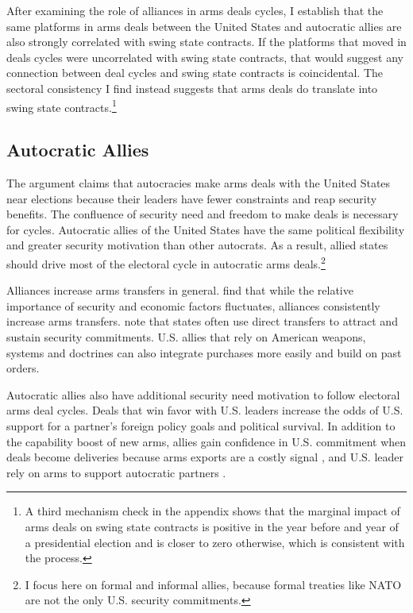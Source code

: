 \documentclass[12pt]{article}
\begin{document}
After examining the role of alliances in arms deals cycles, I establish that the same platforms in arms deals between the United States and autocratic allies are also strongly correlated with swing state contracts.
If the platforms that moved in deals cycles were uncorrelated with swing state contracts, that would suggest any connection between deal cycles and swing state contracts is coincidental.
The sectoral consistency I find instead suggests that arms deals do translate into swing state contracts.\footnote{A third mechanism check in the appendix shows that the marginal impact of arms deals on swing state contracts is positive in the year before and year of a presidential election and is closer to zero otherwise, which is consistent with the process.}



\subsection{Autocratic Allies}


The argument claims that autocracies make arms deals with the United States near elections because their leaders have fewer constraints and reap security benefits. 
The confluence of security need and freedom to make deals is necessary for cycles. 
Autocratic allies of the United States have the same political flexibility and greater security motivation than other autocrats. 
As a result, allied states should drive most of the electoral cycle in autocratic arms deals.\footnote{I focus here on formal and informal allies, because formal treaties like NATO are not the only U.S. security commitments.}


Alliances increase arms transfers in general. 
\citet{Thurneretal2019} find that while the relative importance of security and economic factors fluctuates, alliances consistently increase arms transfers.
\citet[pg. 184-5]{IkenberryGrieco2003} note that states often use direct transfers to attract and sustain security commitments. 
U.S. allies that rely on American weapons, systems and doctrines can also integrate purchases more easily and build on past orders. 


Autocratic allies also have additional security need motivation to follow electoral arms deal cycles. 
Deals that win favor with U.S. leaders increase the odds of U.S. support for a partner's foreign policy goals and political survival.  
In addition to the capability boost of new arms, allies gain confidence in U.S. commitment when deals become deliveries because arms exports are a costly signal \citep{McManusYarhi-Milo2017}, and U.S. leader rely on arms to support autocratic partners \citep{Yarhi-Miloetal2016}.
\end{document}

